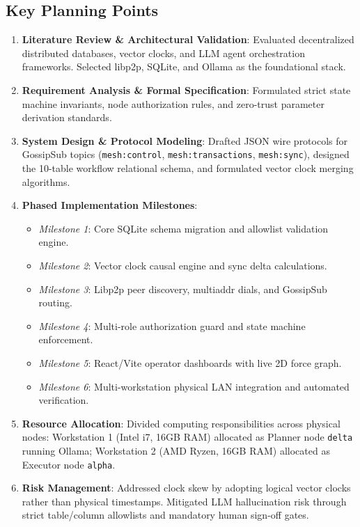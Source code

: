 \documentclass[12pt,a4paper]{report}
\begin{document}
\subsection*{Key Planning Points}
\begin{enumerate}[label=\roman*.,leftmargin=*,itemsep=3pt]
    \item \textbf{Literature Review \& Architectural Validation}: Evaluated decentralized distributed databases, vector clocks, and LLM agent orchestration frameworks. Selected libp2p, SQLite, and Ollama as the foundational stack.
    \item \textbf{Requirement Analysis \& Formal Specification}: Formulated strict state machine invariants, node authorization rules, and zero-trust parameter derivation standards.
    \item \textbf{System Design \& Protocol Modeling}: Drafted JSON wire protocols for GossipSub topics (\texttt{mesh:control}, \texttt{mesh:transactions}, \texttt{mesh:sync}), designed the 10-table workflow relational schema, and formulated vector clock merging algorithms.
    \item \textbf{Phased Implementation Milestones}:
    \begin{itemize}[leftmargin=*,itemsep=1pt]
        \item \textit{Milestone 1}: Core SQLite schema migration and allowlist validation engine.
        \item \textit{Milestone 2}: Vector clock causal engine and sync delta calculations.
        \item \textit{Milestone 3}: Libp2p peer discovery, multiaddr dials, and GossipSub routing.
        \item \textit{Milestone 4}: Multi-role authorization guard and state machine enforcement.
        \item \textit{Milestone 5}: React/Vite operator dashboards with live 2D force graph.
        \item \textit{Milestone 6}: Multi-workstation physical LAN integration and automated verification.
    \end{itemize}
    \item \textbf{Resource Allocation}: Divided computing responsibilities across physical nodes: Workstation 1 (Intel i7, 16GB RAM) allocated as Planner node \texttt{delta} running Ollama; Workstation 2 (AMD Ryzen, 16GB RAM) allocated as Executor node \texttt{alpha}.
    \item \textbf{Risk Management}: Addressed clock skew by adopting logical vector clocks rather than physical timestamps. Mitigated LLM hallucination risk through strict table/column allowlists and mandatory human sign-off gates.
\end{enumerate}
\end{document}

